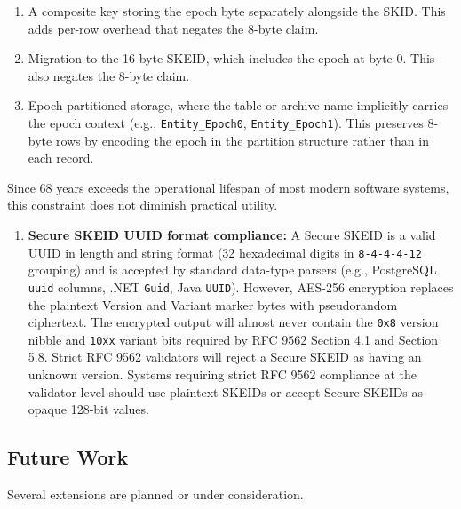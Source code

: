\documentclass[fleqn,10pt]{wlpeerj}
\providecommand{\tightlist}{%
  \setlength{\itemsep}{0pt}\setlength{\parskip}{0pt}}
\begin{document}
\begin{enumerate}
  \begin{enumerate}
  \def\labelenumii{\arabic{enumii}.}
  \item
    A composite key storing the epoch byte separately alongside the
    SKID. This adds per-row overhead that negates the 8-byte claim.
  \item
    Migration to the 16-byte SKEID, which includes the epoch at byte 0.
    This also negates the 8-byte claim.
  \item
    Epoch-partitioned storage, where the table or archive name
    implicitly carries the epoch context (e.g., \texttt{Entity\_Epoch0},
    \texttt{Entity\_Epoch1}). This preserves 8-byte rows by encoding the
    epoch in the partition structure rather than in each record.
  \end{enumerate}
\end{enumerate}

Since 68 years exceeds the operational lifespan of most modern software
systems, this constraint does not diminish practical utility.

\begin{enumerate}
\def\labelenumi{\arabic{enumi}.}
\setcounter{enumi}{5}
\tightlist
\item
  \textbf{Secure SKEID UUID format compliance:} A Secure SKEID is a
  valid UUID in length and string format (32 hexadecimal digits in
  \texttt{8-4-4-4-12} grouping) and is accepted by standard data-type
  parsers (e.g., PostgreSQL \texttt{uuid} columns, .NET \texttt{Guid},
  Java \texttt{UUID}). However, AES-256 encryption replaces the
  plaintext Version and Variant marker bytes with pseudorandom
  ciphertext. The encrypted output will almost never contain the
  \texttt{0x8} version nibble and \texttt{10xx} variant bits required by
  RFC 9562 Section 4.1 and Section 5.8. Strict RFC 9562 validators will
  reject a Secure SKEID as having an unknown version. Systems requiring
  strict RFC 9562 compliance at the validator level should use plaintext
  SKEIDs or accept Secure SKEIDs as opaque 128-bit values.
\end{enumerate}

\subsection{Future Work}\label{future-work}

Several extensions are planned or under consideration.
\end{document}
